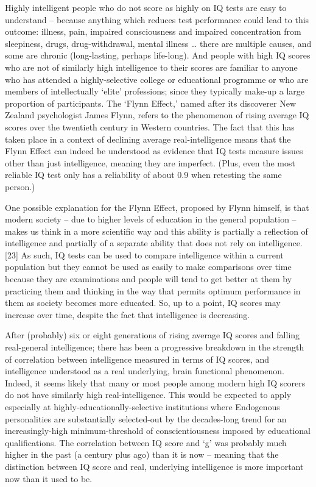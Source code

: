 \documentclass[
]{book}
\begin{document}
Highly intelligent people who do not score as highly on IQ tests are easy to understand -- because anything which reduces test performance could lead to this outcome: illness, pain, impaired consciousness and impaired concentration from sleepiness, drugs, drug-withdrawal, mental illness \ldots{} there are multiple causes, and some are chronic (long-lasting, perhaps life-long).
And people with high IQ scores who are not of similarly high intelligence to their scores are familiar to anyone who has attended a highly-selective college or educational programme or who are members of intellectually `elite' professions; since they typically make-up a large proportion of participants. The `Flynn Effect,' named after its discoverer New Zealand psychologist James Flynn, refers to the phenomenon of rising average IQ scores over the twentieth century in Western countries. The fact that this has taken place in a context of declining average real-intelligence means that the Flynn Effect can indeed be understood as evidence that IQ tests measure issues other than just intelligence, meaning they are imperfect. (Plus, even the most reliable IQ test only has a reliability of about 0.9 when retesting the same person.)

One possible explanation for the Flynn Effect, proposed by Flynn himself, is that modern society -- due to higher levels of education in the general population -- makes us think in a more scientific way and this ability is partially a reflection of intelligence and partially of a separate ability that does not rely on intelligence.{[}23{]} As such, IQ tests can be used to compare intelligence within a current population but they cannot be used as easily to make comparisons over time because they are examinations and people will tend to get better at them by practicing them and thinking in the way that permits optimum performance in them as society becomes more educated. So, up to a point, IQ scores may increase over time, despite the fact that intelligence is decreasing.

After (probably) six or eight generations of rising average IQ scores and falling real-general intelligence; there has been a progressive breakdown in the strength of correlation between intelligence measured in terms of IQ scores, and intelligence understood as a real underlying, brain functional phenomenon. Indeed, it seems likely that many or most people among modern high IQ scorers do not have similarly high real-intelligence. This would be expected to apply especially at highly-educationally-selective institutions where Endogenous personalities are substantially selected-out by the decades-long trend for an increasingly-high minimum-threshold of conscientiousness imposed by educational qualifications.
The correlation between IQ score and `g' was probably much higher in the past (a century plus ago) than it is now -- meaning that the distinction between IQ score and real, underlying intelligence is more important now than it used to be.
\end{document}
